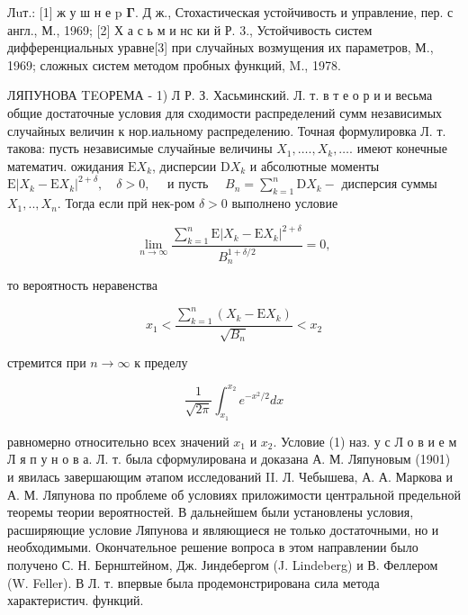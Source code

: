 \documentclass[10pt]{article}
\begin{document}
Лuт.: [1] ж у ш н е p $\boldsymbol{\Gamma}$. Д ж., Стохастическая устойчивость и управление, пер. с англ., М., 1969; [2] Х а с ь м и нс ки й Р. 3., Устойчивость систем дифференциальных уравне[3] при случайных возмущения их параметров, М., 1969; сложных систем методом пробных функций, M., 1978.



ЛЯПУНОВА TEOРЕМА - 1) Л Р. З. Хасьминский. Л. т. в т е о р и и весьма общие достаточные условия для сходимости распределений сумм независимых случайных величин к нор.иальному распределению. Точная формулировка Л. т. такова: пусть независимые случайные величины $X_{1}, \ldots ., X_{k}, \ldots$. имеют конечные математич. ожидания $\mathrm{E} X_{k}$, дисперсии $\mathrm{D} X_{k}$ и абсолютные моменты $\mathrm{E}\left|X_{k}-\mathrm{E} X_{k}\right|^{2+\delta}, \quad \delta>0, \quad$ и пусть $\quad B_{n}=\sum_{k=1}^{n} \mathrm{D} X_{k}-$ дисперсия суммы $X_{1}, . ., X_{n}$. Тогда если прй нек-ром $\delta>0$ выполнено условие



\[

\lim _{n \rightarrow \infty} \frac{\sum_{k=1}^{n} \mathrm{E}\left|X_{k}-\mathrm{E} X_{k}\right|^{2+\delta}}{B_{n}^{1+\delta / 2}}=0,

\]



то вероятность неравенства



\[

x_{1}<\frac{\sum_{k=1}^{n}\left(X_{k}-\mathrm{E} X_{k}\right)}{\sqrt{B_{n}}}<x_{2}

\]



стремится при $n \rightarrow \infty$ к пределу



\[

\frac{1}{\sqrt{2 \pi}} \int_{x_{1}}^{x_{2}} e^{-x^{2} / 2} d x

\]



равномерно относительно всех значений $x_{1}$ и $x_{2}$. Условие (1) наз. у с Л о в и е м Л я п у н о в а. Л. т. была сформулирована и доказана А. М. Ляпуновым (1901) и явилась завершающим әтапом исследований II. Л. Чебышева, А. А. Маркова и А. М. Ляпунова по проблеме об условиях приложимости центральной предельной теоремы теории вероятностей. В дальнейшем были установлены условия, расширяющие условие Ляпунова и являющиеся не только достаточными, но и необходимыми. Окончательное решение вопроса в этом направлении было получено С. Н. Бернштейном, Дж. Јиндебергом (J. Lindeberg) и В. Феллером (W. Feller). В Л. т. впервые была продемонстрирована сила метода характеристич. функций.
\end{document}
